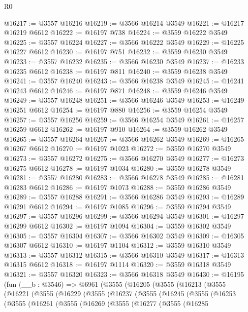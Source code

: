 \begin{lexlean}{R0}
\begin{coremodule}
@16217 := @3557 @16216
@16219 := @3566 @16214 @3549
@16221 := @16217 @16219 @6612
@16222 := @16197 @738
@16224 := @3559 @16222 @3549
@16225 := @3557 @16224
@16227 := @3566 @16222 @3549
@16229 := @16225 @16227 @6612
@16230 := @16197 @751
@16232 := @3559 @16230 @3549
@16233 := @3557 @16232
@16235 := @3566 @16230 @3549
@16237 := @16233 @16235 @6612
@16238 := @16197 @811
@16240 := @3559 @16238 @3549
@16241 := @3557 @16240
@16243 := @3566 @16238 @3549
@16245 := @16241 @16243 @6612
@16246 := @16197 @871
@16248 := @3559 @16246 @3549
@16249 := @3557 @16248
@16251 := @3566 @16246 @3549
@16253 := @16249 @16251 @6612
@16254 := @16197 @880
@16256 := @3559 @16254 @3549
@16257 := @3557 @16256
@16259 := @3566 @16254 @3549
@16261 := @16257 @16259 @6612
@16262 := @16197 @910
@16264 := @3559 @16262 @3549
@16265 := @3557 @16264
@16267 := @3566 @16262 @3549
@16269 := @16265 @16267 @6612
@16270 := @16197 @1023
@16272 := @3559 @16270 @3549
@16273 := @3557 @16272
@16275 := @3566 @16270 @3549
@16277 := @16273 @16275 @6612
@16278 := @16197 @1034
@16280 := @3559 @16278 @3549
@16281 := @3557 @16280
@16283 := @3566 @16278 @3549
@16285 := @16281 @16283 @6612
@16286 := @16197 @1073
@16288 := @3559 @16286 @3549
@16289 := @3557 @16288
@16291 := @3566 @16286 @3549
@16293 := @16289 @16291 @6612
@16294 := @16197 @1085
@16296 := @3559 @16294 @3549
@16297 := @3557 @16296
@16299 := @3566 @16294 @3549
@16301 := @16297 @16299 @6612
@16302 := @16197 @1094
@16304 := @3559 @16302 @3549
@16305 := @3557 @16304
@16307 := @3566 @16302 @3549
@16309 := @16305 @16307 @6612
@16310 := @16197 @1104
@16312 := @3559 @16310 @3549
@16313 := @3557 @16312
@16315 := @3566 @16310 @3549
@16317 := @16313 @16315 @6612
@16318 := @16197 @1114
@16320 := @3559 @16318 @3549
@16321 := @3557 @16320
@16323 := @3566 @16318 @3549
@16430 := @16195
    (fun (__b : @3546) =>
    @6961
      (@3555
        (@16205
          (@3555
            (@16213
              (@3555
                (@16221
                  (@3555
                    (@16229
                      (@3555
                        (@16237
                          (@3555
                            (@16245
                              (@3555
                                (@16253
                                  (@3555
                                    (@16261
                                      (@3555
                                        (@16269
                                          (@3555
                                            (@16277
                                              (@3555
                                                (@16285

\end{coremodule}
\end{lexlean}
